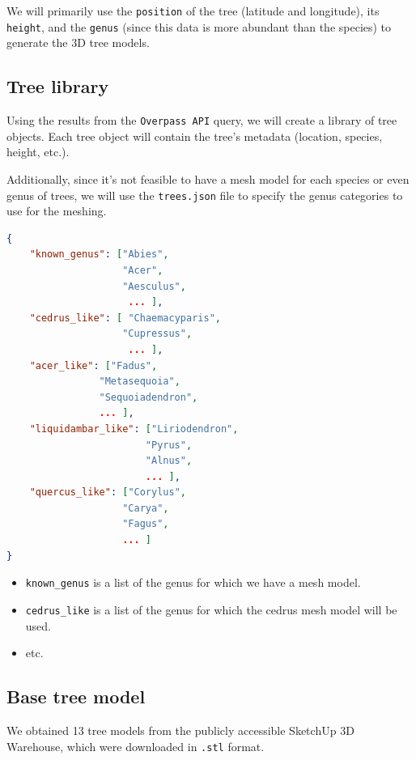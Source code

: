 \documentclass[12pt]{article}
\begin{document}
We will primarily use the \texttt{position} of the tree
(latitude and longitude), its \texttt{height}, and the \texttt{genus}
(since this data is more abundant than the species) to generate the 3D tree models.

\newpage

\subsection{Tree library}
Using the results from the \texttt{Overpass API} query, we will create a library
of tree objects. Each tree object will contain the tree's metadata (location,
species, height, etc.).

Additionally, since it's not feasible to have a mesh model for each species or even genus
of trees, we will use the \texttt{trees.json} file to specify the genus
categories to use for the meshing.

\begin{lstlisting}[language=json]
{
    "known_genus": ["Abies",
                    "Acer",
                    "Aesculus",
                     ... ],
    "cedrus_like": [ "Chaemacyparis",
                    "Cupressus",
                     ... ],
    "acer_like": ["Fadus",
                "Metasequoia",
                "Sequoiadendron",
                ... ],
    "liquidambar_like": ["Liriodendron",
                        "Pyrus",
                        "Alnus",
                        ... ],
    "quercus_like": ["Corylus",
                    "Carya",
                    "Fagus",
                    ... ]
}
\end{lstlisting}

\begin{itemize}
    \item \texttt{known\_genus} is a list of the genus for which we have a mesh model.
    \item \texttt{cedrus\_like} is a list of the genus for which the cedrus mesh model will be used.
    \item etc.
\end{itemize}

\newpage

\subsection{Base tree model}
We obtained 13 tree models from the publicly accessible SketchUp\cite{sketchup}
3D Warehouse, which were downloaded in \texttt{.stl} format.
\end{document}
